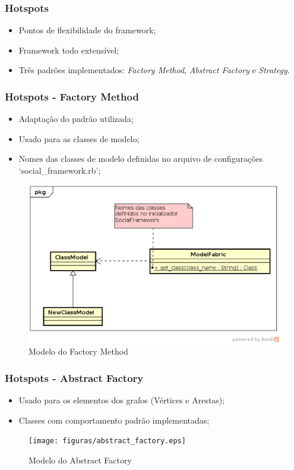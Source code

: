 \documentclass{beamer}
\begin{document}
\begin{frame}
\frametitle{Hotspots}

\begin{itemize}
	\item Pontos de flexibilidade do framework;
	\item Framework todo extensível;
	\item Três padrões implementados: \textit{Factory Method}, \textit{Abstract Factory} e \textit{Strategy}.
\end{itemize}

\end{frame}

\begin{frame}
\frametitle{Hotspots - Factory Method}

\begin{itemize}
	\item Adaptação do padrão utilizada;
	\item Usado para as classes de modelo;
	\item Nomes das classes de modelo definidas no arquivo de configurações `social\_framework.rb';
\end{itemize}

\begin{figure}[h]
	\centering
	\includegraphics[scale=0.35]{figuras/factory_method.eps}
	\caption{Modelo do Factory Method}
\end{figure}

\end{frame}

\begin{frame}
\frametitle{Hotspots - Abstract Factory}

\begin{itemize}
	\item Usado para os elementos dos grafos (Vértices e Arestas);
	\item Classes com comportamento padrão implementadas;
\end{itemize}

\begin{figure}[h]
	\centering
	\texttt{[image: figuras/abstract\_factory.eps]}
	\caption{Modelo do Abstract Factory}
\end{figure}

\end{frame}
\end{document}
